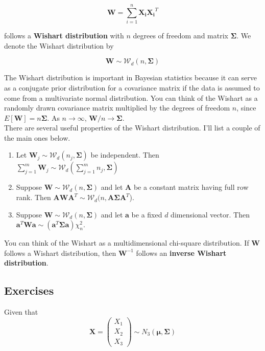 \documentclass[11pt]{article}
\theoremstyle{definition}
\begin{document}
$$ \mathbf{W} = \sum_{i = 1}^n \mathbf{X_i} \mathbf{X_i}^T$$

follows a \textbf{Wishart distribution} with $n$ degrees of freedom and matrix $\mathbf{\Sigma}$.  We denote the Wishart distribution by

$$\mathbf{W} \sim \mathcal{W}_d(n, \mathbf{\Sigma})$$

The Wishart distribution is important in Bayesian statistics because it can serve as a conjugate prior distribution for a covariance matrix if the data is assumed to come from a multivariate normal distribution.  You can think of the Wishart as a randomly drawn covariance matrix multiplied by the degrees of freedom $n$, since $E[\mathbf{W}] = n\mathbf{\Sigma}$.  As $n \rightarrow \infty$, $\mathbf{W}/n \rightarrow \mathbf{\Sigma}$.    \\

There are several useful properties of the Wishart distribution.  I'll list a couple of the main ones below.

\begin{enumerate}
\item Let $\mathbf{W}_j \sim \mathcal{W}_d(n_j, \mathbf{\Sigma})$ be independent.  Then $\sum_{j = 1}^m \mathbf{W}_j \sim \mathcal{W}_d(\sum_{j=1}^m n_j, \mathbf{\Sigma})$
\item Suppose $\mathbf{W} \sim \mathcal{W}_d(n, \mathbf{\Sigma})$ and let $\mathbf{A}$ be a constant matrix having full row rank.  Then $\mathbf{AWA}^T \sim \mathcal{W}_d(n, \mathbf{A\Sigma A}^T$).
\item  Suppose $\mathbf{W} \sim \mathcal{W}_d(n, \mathbf{\Sigma})$ and let $\mathbf{a}$ be a fixed $d$ dimensional vector.  Then $\mathbf{a}^T\mathbf{Wa} \sim (\mathbf{a}^T\mathbf{\Sigma a})\chi^2_n$.
\end{enumerate}

You can think of the Wishart as a multidimensional chi-square distribution.  If $\mathbf{W}$ follows a Wishart distribution, then $\mathbf{W}^{-1}$ follows an \textbf{inverse Wishart distribution}.

\newpage
\subsection{Exercises}
Given that 
$$\mathbf{X} =  
\begin{pmatrix}
X_1\\
X_2\\
X_3
\end{pmatrix}
\sim N_3(\mathbf{\mu}, \mathbf{\Sigma}) 
$$
\end{document}
